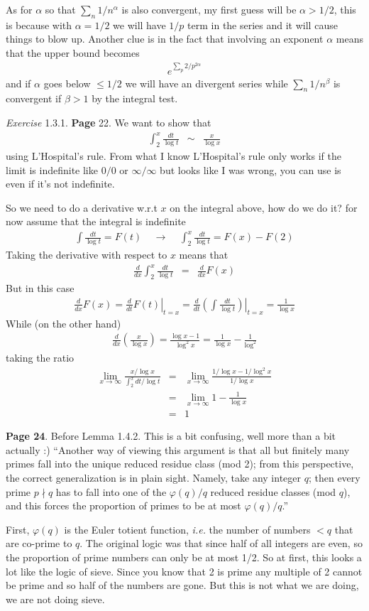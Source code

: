\documentclass[aps,preprint,preprintnumbers,nofootinbib,showpacs,prd]{revtex4-1}
\newcommand{\ie}{{\it i.e.} }
\newcommand{\nbea}{\begin{eqnarray*}}
\newcommand{\neea}{\end{eqnarray*}}
\begin{document}
As for $\alpha$ so that $\sum_n 1/n^\alpha$ is also convergent, my first guess will be $\alpha > 1/2$, this is because with $\alpha = 1/2$ we will have $1/p$ term in the series and it will cause things to blow up. Another clue is in the fact that involving an exponent $\alpha$ means that the upper bound becomes
%
\nbea
e^{\sum_{p} 2/p^{2\alpha}}
\neea
%
and if $\alpha$ goes below $\le 1/2$ we will have an divergent series while $\sum_n 1/n^\beta$ is convergent if $\beta > 1$ by the integral test.

{\it Exercise } 1.3.1. {\bf Page} 22. We want to show that
%
\nbea
\int_2^x \frac{dt}{\log t} & \sim & \frac{x}{\log x}
\neea
%
using L'Hospital's rule. From what I know L'Hospital's rule only works if the limit is indefinite like $0/0$ or $\infty/\infty$ but looks like I was wrong, you can use is even if it's not indefinite.

So we need to do a derivative w.r.t $x$ on the integral above, how do we do it? for now assume that the integral is indefinite
%
\nbea
\int \frac{dt}{\log t} = F(t) ~~~~~ \longrightarrow ~~~~~ \int_2^x \frac{dt}{\log t} = F(x) - F(2)
\neea
%
Taking the derivative with respect to $x$ means that
%
\nbea
\frac{d}{dx} \int_2^x \frac{dt}{\log t} & = & \frac{d}{dx} F(x)
\neea
%
But in this case
%
\nbea
\frac{d}{dx} F(x) = \left.\frac{d}{dt}F(t) \right|_{t = x} = \left.\frac{d}{dt}\left(\int \frac{dt}{\log t}\right) \right|_{t = x} = \frac{1}{\log x}
\neea
%
While (on the other hand)
%
\nbea
\frac{d}{dx} \left ( \frac{x}{\log x} \right )  = \frac{\log x - 1}{\log^2 x} = \frac{1}{\log x} - \frac{1}{\log^2}
\neea
%
taking the ratio
%
\nbea
\lim_{x\to\infty} \frac{x/\log x}{\int_2^x dt/\log t} & = & \lim_{x\to\infty} \frac{1/\log x - 1/\log^2x}{1/\log x} \\
& = & \lim_{x\to\infty} 1 - \frac{1}{\log x} \\
& = & 1
\neea
%

{\bf Page 24}. Before Lemma 1.4.2. This is a bit confusing, well more than a bit actually :) ``Another way of viewing this argument is that all but finitely many primes fall into the unique reduced residue class (mod 2); from this perspective, the correct generalization is in plain sight. Namely, take any integer $q$; then every prime $p \nmid q$ has to fall into one of the $\varphi(q)/q$ reduced residue classes (mod $q$), and this forces the proportion of primes to be at most $\varphi(q)/q$.''

First, $\varphi(q)$ is the Euler totient function, \ie the number of numbers $< q$ that are co-prime to $q$. The original logic was that since half of all integers are even, so the proportion of prime numbers can only be at most 1/2. So at first, this looks a lot like the logic of sieve. Since you know that 2 is prime any multiple of 2 cannot be prime and so half of the numbers are gone. But this is not what we are doing, we are not doing sieve.
\end{document}
